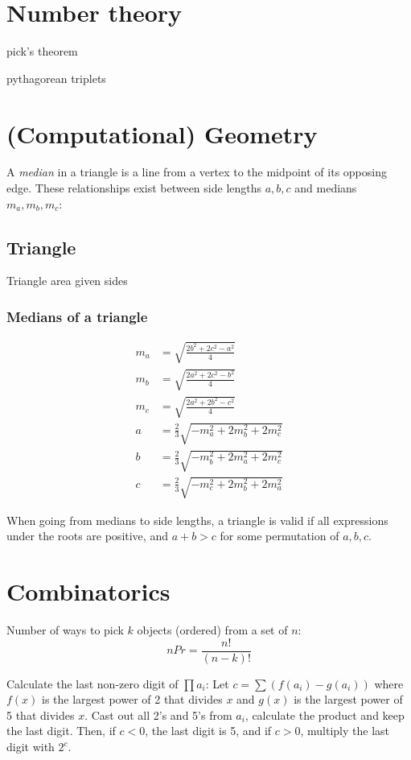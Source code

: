 \documentclass[a4paper,11pt]{article}
\begin{document}
\section{Number theory}

pick's theorem

pythagorean triplets


\section{(Computational) Geometry}

A \emph{median} in a triangle is a line from a vertex to the midpoint of its opposing edge. These relationships exist between side lengths $a,b,c$ and medians $m_a,m_b,m_c$:

\subsection{Triangle}

Triangle area given sides

\subsubsection{Medians of a triangle}

\begin{align*}
	m_a &= \sqrt{\frac{2b^2+2c^2-a^2}{4}}\\
	m_b &= \sqrt{\frac{2a^2+2c^2-b^2}{4}}\\
	m_c &= \sqrt{\frac{2a^2+2b^2-c^2}{4}}\\
	a &= \frac{2}{3}\sqrt{-m_a^2 + 2m_b^2 + 2m_c^2} \\
	b &= \frac{2}{3}\sqrt{-m_b^2 + 2m_a^2 + 2m_c^2} \\
	c &= \frac{2}{3}\sqrt{-m_c^2 + 2m_b^2 + 2m_a^2}
\end{align*}

When going from medians to side lengths, a triangle is valid if all expressions under the roots are positive, and $a+b>c$ for some permutation of $a,b,c$.

\section{Combinatorics}

Number of ways to pick $k$ objects (ordered) from a set of $n$: $$n P r = \frac{n!}{(n-k)!}$$

Calculate the last non-zero digit of $\prod a_i$: Let $c=\sum (f(a_i)-g(a_i))$ where $f(x)$ is the largest power of 2 that divides $x$ and $g(x)$ is the largest power of 5 that divides $x$. Cast out all 2's and 5's from $a_i$, calculate the product and keep the last digit. Then, if $c<0$, the last digit is 5, and if $c>0$, multiply the last digit with $2^c$.
\end{document}
